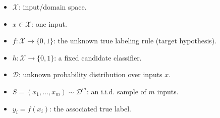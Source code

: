 \documentclass[11pt,a4paper]{article}
\theoremstyle{definition}
\begin{document}
\begin{itemize}
    \item $\mathcal{X}$: input/domain space.
    \item $x \in \mathcal{X}$: one input.
    \item $f : \mathcal{X} \to \{0, 1\}$: the unknown true labeling rule (target hypothesis).
    \item $h : \mathcal{X} \to \{0, 1\}$: a fixed candidate classifier.
    \item $\mathcal{D}$: unknown probability distribution over inputs $x$.
    \item $S = (x_1, \dots, x_m) \sim \mathcal{D}^m$: an i.i.d. sample of $m$ inputs.
    \item $y_i = f(x_i)$: the associated true label.
\end{itemize}
\end{document}
